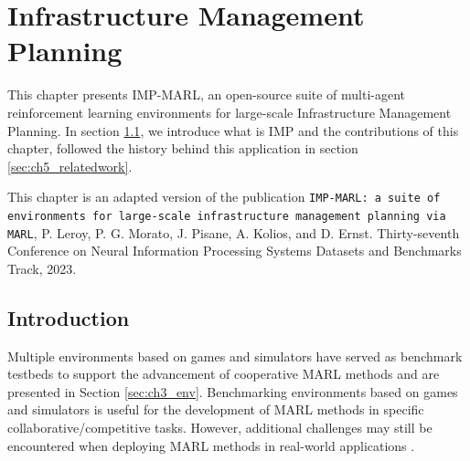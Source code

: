 \chapter{Infrastructure Management Planning}\label{ch:impmarl}

\begin{chapter_outline}

This chapter presents IMP-MARL, an open-source suite of multi-agent reinforcement learning environments for large-scale Infrastructure Management Planning.
In section \ref{sec:ch5_intro}, we introduce what is IMP and the contributions of this chapter, followed the history behind this application in section \ref{sec:ch5_relatedwork}.

This chapter is an adapted version of the publication \citep{leroy2023impmarl} \texttt{IMP-MARL: a suite of environments for large-scale infrastructure management planning via MARL}, P. Leroy, P. G. Morato, J. Pisane, A. Kolios, and D. Ernst. Thirty-seventh Conference on Neural Information Processing Systems Datasets and Benchmarks Track, 2023.
\end{chapter_outline}

\section{Introduction}\label{sec:ch5_intro}
Multiple environments based on games and simulators have served as benchmark testbeds to support the advancement of cooperative MARL methods and are presented in Section \ref{sec:ch3_env}.
Benchmarking environments based on games and simulators is useful for the development of MARL methods in specific collaborative/competitive tasks.
However, additional challenges may still be encountered when deploying MARL methods in real-world applications \citep{oroojlooy2022review}.

